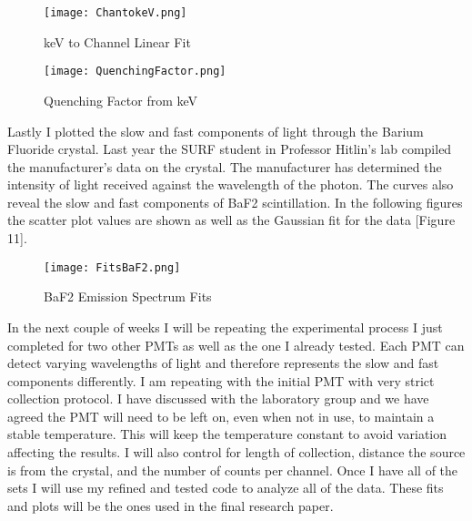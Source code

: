 \documentclass{article}
\begin{document}
\begin{figure}[H]
  \centering
  \begin{minipage}[b]{0.4\textwidth}
    \texttt{[image: ChantokeV.png]}
    \caption{keV to Channel Linear Fit}
  \end{minipage}
  \hfill
  \begin{minipage}[b]{0.4\textwidth}
    \texttt{[image: QuenchingFactor.png]}
    \caption{Quenching Factor from keV}
  \end{minipage}
\end{figure}

Lastly I plotted the slow and fast components of light through the Barium Fluoride crystal. Last year the SURF student in Professor Hitlin’s lab compiled the manufacturer’s data on the crystal. The manufacturer has determined the intensity of light received against the wavelength of the photon. The curves also reveal the slow and fast components of BaF2 scintillation. In the following figures the scatter plot values are shown as well as the Gaussian fit for the data [Figure 11].




\begin{wrapfigure}{r}{0.4\textwidth}
  \begin{center}
    \texttt{[image: FitsBaF2.png]}
  \end{center}
  \caption{BaF2 Emission Spectrum Fits}
\end{wrapfigure}

In the next couple of weeks I will be repeating the experimental process I just completed for two other PMTs as well as the one I already tested. Each PMT can detect varying wavelengths of light and therefore represents the slow and fast components differently. I am repeating with the initial PMT with very strict collection protocol. I have discussed with the laboratory group and we have agreed the PMT will need to be left on, even when not in use, to maintain a stable temperature. This will keep the temperature constant to avoid variation affecting the results. I will also control for length of collection, distance the source is from the crystal, and the number of counts per channel. Once I have all of the sets I will use my refined and tested code to analyze all of the data. These fits and plots will be the ones used in the final research paper. 
\end{document}
